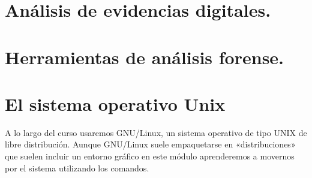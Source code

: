 \documentclass[letterpaper,10pt,spanish]{sphinxmanual}
\begin{document}
\section{Análisis de evidencias digitales.}
\label{\detokenize{tema_pautas_seguridad_informatica/tema_pautas_seguridad_informatica:analisis-de-evidencias-digitales}}

\section{Herramientas de análisis forense.}
\label{\detokenize{tema_pautas_seguridad_informatica/tema_pautas_seguridad_informatica:herramientas-de-analisis-forense}}

\section{El sistema operativo Unix}
\label{\detokenize{tema_pautas_seguridad_informatica/tema_pautas_seguridad_informatica:el-sistema-operativo-unix}}
A lo largo del curso usaremos GNU/Linux, un sistema operativo de tipo UNIX de libre distribución. Aunque GNU/Linux suele empaquetarse en «distribuciones» que suelen incluir un entorno gráfico en este módulo aprenderemos a movernos por el sistema utilizando los comandos.
\end{document}
